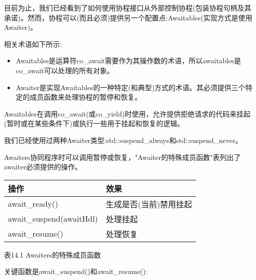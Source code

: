 

目前为止，我们已经看到了如何使用协程接口从外部控制协程(包装协程句柄及其承诺)。然而，协程可以(而且必须)提供另一个配置点:Awaitables(实现方式是使用Awaiter)。

相关术语如下所示:

\begin{itemize}
\item 
Awaitables是运算符co\_await需要作为其操作数的术语，所以awaitables是co\_await可以处理的所有对象。

\item 
Awaiter是实现Awaitables的一种特定(和典型)方式的术语。其必须提供三个特定的成员函数来处理协程的暂停和恢复。
\end{itemize}

Awaitables在调用co\_await(或co\_yield)时使用，允许提供拒绝请求的代码来挂起(暂时或在某些条件下)或执行一些用于挂起和恢复的逻辑。

我们已经使用过两种Awaiter类型:std::suspend\_always和std::suspend\_never。


Awaiters协同程序时可以调用暂停或恢复，"Awaiter的特殊成员函数"表列出了awaiter必须提供的操作。

\begin{longtable}[c]{|l|l|}
\hline
\textbf{操作}       & \textbf{效果}                                   \\ \hline
\endfirsthead
%
\endhead
%
await\_ready()           & 生成是否(当前)禁用挂起 \\ \hline
await\_suspend(awaitHdl) & 处理挂起                                 \\ \hline
await\_resume()          & 处理恢复                                 \\ \hline
\end{longtable}

\begin{center}
表14.1 Awaiters的特殊成员函数
\end{center}

关键函数是await\_suspend()和await\_resume():

